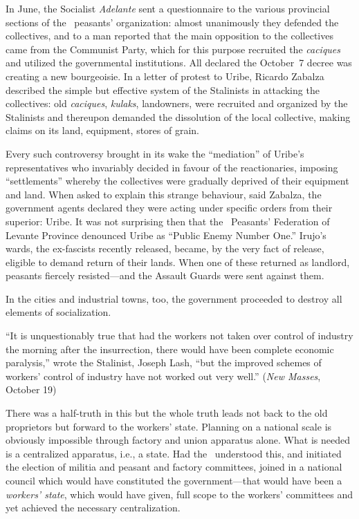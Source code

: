 In June, the Socialist \emph{Adelante} sent a questionnaire to the various provincial sections of the \UGT\ peasants’ organization: almost unanimously they defended the collectives, and to a man reported that the main opposition to the collectives came from the Communist Party, which for this purpose recruited the \emph{caciques} and utilized the governmental institutions. All declared the October~7 decree was creating a new bourgeoisie. In a letter of protest to Uribe, Ricardo Zabalza described the simple but effective system of the Stalinists in attacking the collectives: old \emph{caciques}, \emph{kulaks}, landowners, were recruited and organized by the Stalinists and thereupon demanded the dissolution of the local collective, making claims on its land, equipment, stores of grain.

Every such controversy brought in its wake the ``mediation'' of Uribe’s representatives who invariably decided in favour of the reactionaries, imposing ``settlements'' whereby the collectives were gradually deprived of their equipment and land. When asked to explain this strange behaviour, said Zabalza, the government agents declared they were acting under specific orders from their superior: Uribe. It was not surprising then that the \UGT\ Peasants’ Federation of Levante Province denounced Uribe as ``Public Enemy Number One.'' Irujo’s wards, the ex-fascists recently released, became, by the very fact of release, eligible to demand return of their lands. When one of these returned as landlord, peasants fiercely resisted---and the Assault Guards were sent against them.

In the cities and industrial towns, too, the government proceeded to destroy all elements of socialization.

``It is unquestionably true that had the workers not taken over control of industry the morning after the insurrection, there would have been complete economic paralysis,''
wrote the Stalinist, Joseph Lash,
``but the improved schemes of workers’ control of industry have not worked out very well.'' (\emph{New Masses}, October 19)  

There was a half-truth in this but the whole truth leads not back to the old proprietors but forward to the workers’ state. Planning on a national scale is obviously impossible through factory and union apparatus alone. What is needed is a centralized apparatus, i.e., a state. Had the \CNT\ understood this, and initiated the election of militia and peasant and factory committees, joined in a national council which would have constituted the government---that would have been a \emph{workers’ state}, which would have given, full scope to the workers’ committees and yet achieved the necessary centralization.

